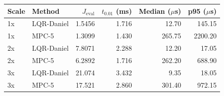 \begin{tabular}{llrrrr}
\toprule
Scale & Method & $J_{\mathrm{eval}}$ & $t_{0.01}$ (ms) & Median ($\mu$s) & p95 ($\mu$s) \\ \midrule
1x & LQR-Daniel & 1.5456 & 1.716 & 12.70 & 145.15 \\ 
1x & MPC-5 & 1.3099 & 1.430 & 265.75 & 2200.20 \\ 
2x & LQR-Daniel & 7.8071 & 2.288 & 12.20 & 17.05 \\ 
2x & MPC-5 & 6.2892 & 1.716 & 262.20 & 688.90 \\ 
3x & LQR-Daniel & 21.074 & 3.432 & 9.35 & 18.05 \\ 
3x & MPC-5 & 17.521 & 2.860 & 301.40 & 972.15 \\ 
\bottomrule
\end{tabular}
